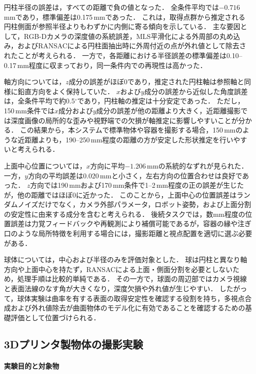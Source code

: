 円柱半径の誤差は，すべての距離で負の値となった．
全条件平均では$-0.716$\,mmであり，標準偏差は0.175\,mmであった．
これは，取得点群から推定される円柱側面が参照半径よりもわずかに内側に寄る傾向を示している．
主な要因として，RGB-Dカメラの深度値の系統誤差，MLS平滑化による外周部の丸め込み，およびRANSACによる円柱面抽出時に外周付近の点が外れ値として除去されたことが考えられる．
一方で，各距離における半径誤差の標準偏差は0.10--0.17\,mm程度に収まっており，同一条件内での再現性は高かった．

軸方向については，$z$成分の誤差がほぼ0であり，推定された円柱軸は参照軸と同様に鉛直方向をよく保持していた．
$x$および$y$成分の誤差から近似した角度誤差は，全条件平均で約0.5$^{\circ}$であり，円柱軸の推定は十分安定であった．
ただし，150\,mm条件では$x$成分および$y$成分の誤差が他の距離より大きく，近距離撮影では深度画像の局所的な歪みや視野端での欠損が軸推定に影響しやすいことが分かる．
この結果から，本システムで標準物体や容器を撮影する場合，150\,mmのような近距離よりも，190--250\,mm程度の距離の方が安定した形状推定を行いやすいと考えられる．

上面中心位置については，$x$方向に平均$-1.206$\,mmの系統的なずれが見られた．
一方，$y$方向の平均誤差は0.020\,mmと小さく，左右方向の位置合わせは良好であった．
$z$方向では190\,mmおよび170\,mm条件で1--2\,mm程度の正の誤差が生じたが，他の距離ではほぼ0に近かった．
このことから，上面中心の位置誤差はランダムノイズだけでなく，カメラ外部パラメータ，ロボット姿勢，および上面分割の安定性に由来する成分を含むと考えられる．
後続タスクでは，数mm程度の位置誤差は力覚フィードバックや再観測により補償可能であるが，容器の縁や注ぎ口のような局所特徴を利用する場合には，撮影距離と視点配置を適切に選ぶ必要がある．

球体については，中心および半径のみを評価対象とした．
球は円柱と異なり軸方向や上面中心を持たず，RANSACによる上面・側面分割を必要としないため，処理手順は比較的単純である．
その一方で，球面の周辺部ではカメラ視線と表面法線のなす角が大きくなり，深度欠損や外れ値が生じやすい．
したがって，球体実験は曲率を有する表面の取得安定性を確認する役割を持ち，多視点合成および外れ値除去が曲面物体のモデル化に有効であることを確認するための基礎評価として位置づけられる．

\subsection{3Dプリンタ製物体の撮影実験}
\label{sec:system:pointcloud:evaluation:3d-printed-object}

\paragraph{実験目的と対象物}

